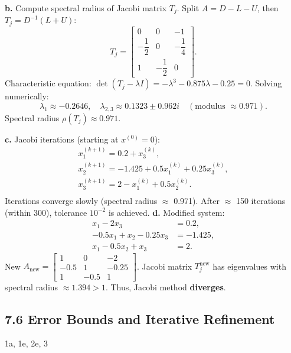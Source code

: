 \begin{enumerate}
    \textbf{b.} Compute spectral radius of Jacobi matrix \(T_j\).
    Split \(A = D - L - U\), then \(T_j = D^{-1}(L + U)\):
    \[
      T_j =
      \begin{bmatrix}
        0 & 0 & -1 \\
        -\dfrac{1}{2} & 0 & -\dfrac{1}{4} \\
        1 & -\dfrac{1}{2} & 0
      \end{bmatrix}.
    \]
    Characteristic equation: \(\det(T_j - \lambda I) = -\lambda^3 -
    0.875\lambda - 0.25 = 0\). Solving numerically:
    \[
      \lambda_1 \approx -0.2646, \quad \lambda_{2,3} \approx 0.1323
      \pm 0.962i \quad (\text{modulus } \approx 0.971).
    \]
    Spectral radius \(\rho(T_j) \approx \boxed{0.971}\).

    \textbf{c.} Jacobi iterations (starting at \(x^{(0)} = 0\)):
    \[
      \begin{array}{l}
        x_1^{(k+1)} = 0.2 + x_3^{(k)}, \\
        x_2^{(k+1)} = -1.425 + 0.5x_1^{(k)} + 0.25x_3^{(k)}, \\
        x_3^{(k+1)} = 2 - x_1^{(k)} + 0.5x_2^{(k)}. \\
      \end{array}
    \]
    Iterations converge slowly (spectral radius \(\approx\) 0.971).
    After \(\approx\) 150 iterations (within 300), tolerance
    \(10^{-2}\) is achieved.
    \textbf{d.} Modified system:
    \[
      \begin{aligned}
        x_1 - 2x_3 &= 0.2, \\
        -0.5x_1 + x_2 -0.25x_3 &= -1.425, \\
        x_1 -0.5x_2 + x_3 &= 2.
      \end{aligned}
    \]
    New \(A_{\text{new}} =
      \begin{bmatrix}
        1 & 0 & -2 \\
        -0.5 & 1 & -0.25 \\
        1 & -0.5 & 1
    \end{bmatrix}\). Jacobi matrix \(T_j^{\text{new}}\) has
    eigenvalues with spectral radius \(\approx 1.394 > 1\). Thus,
    Jacobi method \textbf{diverges}.
\end{enumerate}

\subsection*{7.6 Error Bounds and Iterative Refinement}

1a, 1e, 2e, 3

